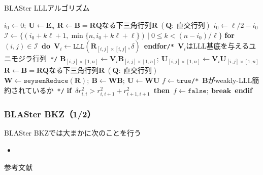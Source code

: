 \documentclass[12pt,aspectratio=169,table,dvipdfmx, leqno]{beamer}
\renewcommand{\Comment}[1]{\quad\texttt{/*}~#1~\texttt{*/}}
\begin{document}
\begin{frame}%
\begin{algorithm}[H]
    \footnotesize
    \begin{algorithmic}[1]
        \caption{\footnotesize BLASter LLLアルゴリズム\cite{DPS25}}
        \label{alg_blaster_lll}
        \State $i_0\gets 0;~\bm{U}\gets \bm{E}_n$
        \Do
            \State $\bm{R}\gets \bm{B}=\bm{RQ}$なる下三角行列$\bm{R}~(\bm{Q}:~\text{直交行列})$
            \State $i_0\gets \ell/2-i_0$
            \State $\mathcal{I}\gets \{(i_0+k\ell+1, \min\{n, i_0+k\ell+\ell\})~|~0\le k<(n-i_0)/\ell\}$
            \State \textbf{for}~$(i, j)\in\mathcal{I}$~\textbf{do}~$\bm{V}_i\gets \texttt{LLL}(\bm{R}_{[i, j]\times [i, j]}, \delta)$~\textbf{endfor}\Comment{$\bm{V}_i$はLLL基底を与えるユニモジラ行列}
                \State $\bm{B}_{[i, j]\times [1, n]}\gets \bm{V}_i\bm{B}_{[i, j]\times [1, n]};~\bm{U}_{[i, j]\times [1, n]}\gets \bm{V}_i\bm{U}_{[i, j]\times [1, n]}$
            \EndFor
            \State $\bm{R}\gets \bm{B}=\bm{RQ}$なる下三角行列$\bm{R}~(\bm{Q}:~\text{直交行列})$
            \State $\bm{W}\gets \texttt{seysenReduce}(\bm{R});~\bm{B}\gets\bm{WB};~\bm{U}\gets\bm{WU}$
            \State $f\gets \texttt{true}$\Comment{$\bm{B}$がweakly-LLL簡約されているか}
                \State \textbf{if}~$\delta r_{i, i}^2> r_{i, i+1}^2+r_{i+1, i+1}^2$~\textbf{then}~$f\gets\texttt{false};~\textbf{break}$~\textbf{endif}
            \EndFor
    \end{algorithmic}
\end{algorithm}
\end{frame}

\begin{frame}
    \frametitle{BLASter BKZ（1/2）}

    BLASter BKZでは大まかに次のことを行う
    \begin{itemize}
        \item 
    \end{itemize}
\end{frame}

\begin{frame}

    

\end{frame}

\begin{frame}[allowframebreaks]{参考文献}
\beamertemplatetextbibitems

\typeout{}

\end{frame}
\end{document}
